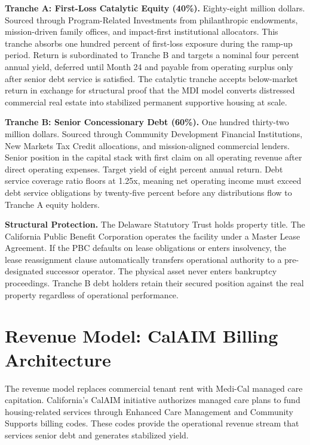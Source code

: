 \documentclass[12pt, letterpaper]{article}
\begin{document}
\textbf{Tranche A: First-Loss Catalytic Equity (40\%).} Eighty-eight million dollars. Sourced through Program-Related Investments from philanthropic endowments, mission-driven family offices, and impact-first institutional allocators. This tranche absorbs one hundred percent of first-loss exposure during the ramp-up period. Return is subordinated to Tranche B and targets a nominal four percent annual yield, deferred until Month 24 and payable from operating surplus only after senior debt service is satisfied. The catalytic tranche accepts below-market return in exchange for structural proof that the MDI model converts distressed commercial real estate into stabilized permanent supportive housing at scale.

\textbf{Tranche B: Senior Concessionary Debt (60\%).} One hundred thirty-two million dollars. Sourced through Community Development Financial Institutions, New Markets Tax Credit allocations, and mission-aligned commercial lenders. Senior position in the capital stack with first claim on all operating revenue after direct operating expenses. Target yield of eight percent annual return. Debt service coverage ratio floors at 1.25x, meaning net operating income must exceed debt service obligations by twenty-five percent before any distributions flow to Tranche A equity holders.

\textbf{Structural Protection.} The Delaware Statutory Trust holds property title. The California Public Benefit Corporation operates the facility under a Master Lease Agreement. If the PBC defaults on lease obligations or enters insolvency, the lease reassignment clause automatically transfers operational authority to a pre-designated successor operator. The physical asset never enters bankruptcy proceedings. Tranche B debt holders retain their secured position against the real property regardless of operational performance.

\clearpage
\section{Revenue Model: CalAIM Billing Architecture}

The revenue model replaces commercial tenant rent with Medi-Cal managed care capitation. California's CalAIM initiative authorizes managed care plans to fund housing-related services through Enhanced Care Management and Community Supports billing codes. These codes provide the operational revenue stream that services senior debt and generates stabilized yield.
\end{document}
